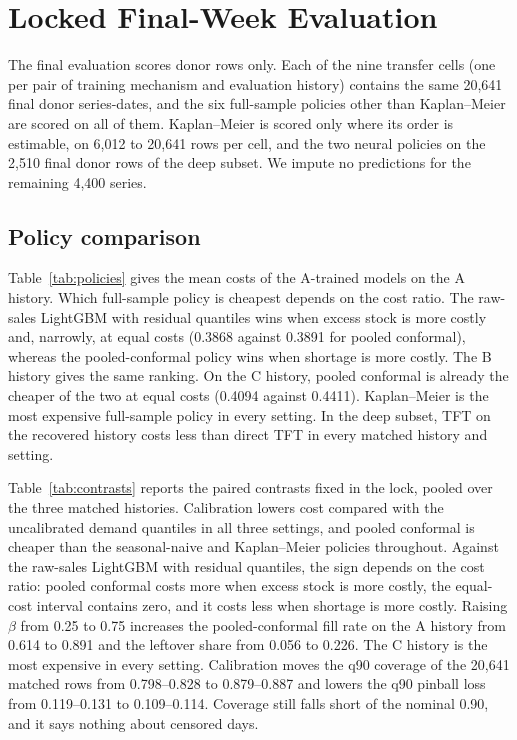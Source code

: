 \section{Locked Final-Week Evaluation}
\label{sec:final}

The final evaluation scores donor rows only. Each of the nine transfer cells (one per pair of training mechanism and evaluation history) contains the same 20,641 final donor series-dates, and the six full-sample policies other than Kaplan--Meier are scored on all of them. Kaplan--Meier is scored only where its order is estimable, on 6,012 to 20,641 rows per cell, and the two neural policies on the 2,510 final donor rows of the deep subset. We impute no predictions for the remaining 4,400 series.

\begin{table}[t]
\centering\footnotesize
\caption{Transfer Gaps of the Pooled-Conformal Policy When Shortage Is More Costly}
\label{tab:transfer}

\end{table}

\subsection{Policy comparison}
\label{sec:policies}

Table~\ref{tab:policies} gives the mean costs of the A-trained models on the A history. Which full-sample policy is cheapest depends on the cost ratio. The raw-sales LightGBM with residual quantiles wins when excess stock is more costly and, narrowly, at equal costs (0.3868 against 0.3891 for pooled conformal), whereas the pooled-conformal policy wins when shortage is more costly. The B history gives the same ranking. On the C history, pooled conformal is already the cheaper of the two at equal costs (0.4094 against 0.4411). Kaplan--Meier is the most expensive full-sample policy in every setting. In the deep subset, TFT on the recovered history costs less than direct TFT in every matched history and setting.

Table~\ref{tab:contrasts} reports the paired contrasts fixed in the lock, pooled over the three matched histories. Calibration lowers cost compared with the uncalibrated demand quantiles in all three settings, and pooled conformal is cheaper than the seasonal-naive and Kaplan--Meier policies throughout. Against the raw-sales LightGBM with residual quantiles, the sign depends on the cost ratio: pooled conformal costs more when excess stock is more costly, the equal-cost interval contains zero, and it costs less when shortage is more costly. Raising $\beta$ from 0.25 to 0.75 increases the pooled-conformal fill rate on the A history from 0.614 to 0.891 and the leftover share from 0.056 to 0.226. The C history is the most expensive in every setting. Calibration moves the q90 coverage of the 20,641 matched rows from 0.798--0.828 to 0.879--0.887 and lowers the q90 pinball loss from 0.119--0.131 to 0.109--0.114. Coverage still falls short of the nominal 0.90, and it says nothing about censored days.

